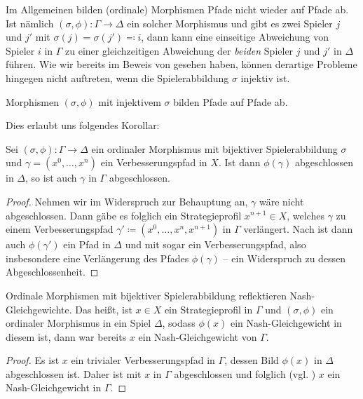 Im Allgemeinen bilden (ordinale) Morphismen Pfade nicht wieder auf Pfade ab. Ist nämlich $(\sigma, \phi): \Gamma \to \Delta$ ein solcher Morphismus und gibt es zwei Spieler $j$ und $j'$ mit $\sigma(j) = \sigma(j') \eqqcolon i$, dann kann eine einseitige Abweichung von Spieler $i$ in $\Gamma$ zu einer gleichzeitigen Abweichung der \emph{beiden} Spieler $j$ und $j'$ in $\Delta$ führen. Wie wir bereits im Beweis von  gesehen haben, können derartige Probleme hingegen nicht auftreten, wenn die Spielerabbildung $\sigma$ injektiv ist.

\begin{beob}\label{beob:PfadeAufPfade}
	Morphismen $(\sigma, \phi)$ mit injektivem $\sigma$ bilden Pfade auf Pfade ab.
\end{beob}

Dies erlaubt uns folgendes Korollar:

\begin{kor}\label{kor:ReflAbg}
	Sei $(\sigma, \phi): \Gamma \to \Delta$ ein ordinaler Morphismus mit bijektiver Spielerabbildung $\sigma$ und $\gamma = (x^0, \dots, x^n)$ ein Verbesserungspfad in $X$. Ist dann $\phi(\gamma)$ abgeschlossen in $\Delta$, so ist auch $\gamma$ in $\Gamma$ abgeschlossen.
\end{kor}
	
\begin{proof}	
	Nehmen wir im Widerspruch zur Behauptung an, $\gamma$ wäre nicht abgeschlossen. Dann gäbe es folglich ein Strategieprofil $x^{n+1} \in X$, welches $\gamma$ zu einem Verbesserungspfad $\gamma' \coloneqq (x^0, \dots, x^n, x^{n+1})$ in $\Gamma$ verlängert. Nach  ist dann auch $\phi(\gamma')$ ein Pfad in $\Delta$ und mit  sogar ein Verbesserungspfad, also insbesondere eine Verlängerung des Pfades $\phi(\gamma)$ -- ein Widerspruch zu dessen Abgeschlossenheit.
\end{proof}

\begin{kor}\label{kor:ReflektNG}
	Ordinale Morphismen mit bijektiver Spielerabbildung reflektieren Nash-Gleichgewichte. Das heißt, ist $x \in X$ ein Strategieprofil in $\Gamma$ und $(\sigma, \phi)$ ein ordinaler Morphismus in ein Spiel $\Delta$, sodass $\phi(x)$ ein Nash-Gleichgewicht in diesem ist, dann war bereits $x$ ein Nash-Gleichgewicht von $\Gamma$.
\end{kor}

\begin{proof}
	Es ist $x$ ein trivialer Verbesserungspfad in $\Gamma$, dessen Bild $\phi(x)$ in $\Delta$ abgeschlossen ist. Daher ist mit  $x$ in $\Gamma$ abgeschlossen und folglich (vgl. ) $x$ ein Nash-Gleichgewicht in $\Gamma$.
\end{proof}

